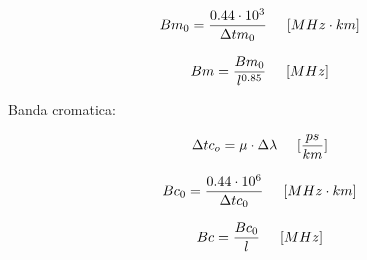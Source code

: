 \documentclass{article}
\begin{document}
    \begin{equation}
        Bm_0 = \frac{0.44 \cdot 10^3}{\Delta tm_0} \hspace{0.5cm} [MHz \cdot km]
    \end{equation}

    \begin{equation}
        Bm = \frac{Bm_0}{l^{0.85}} \hspace{0.5cm} [MHz]
    \end{equation}
    
    Banda cromatica:

    \begin{equation}
        \Delta tc_o = \mu \cdot \Delta \lambda \hspace{0.5cm} [\frac{ps}{km}]
    \end{equation}

    \begin{equation}
        Bc_0 = \frac{0.44 \cdot 10^6}{\Delta tc_0} \hspace{0.5cm} [MHz \cdot km]
    \end{equation}

    \begin{equation}
        Bc = \frac{Bc_0}{l} \hspace{0.5cm} [MHz]
    \end{equation}
\end{document}

